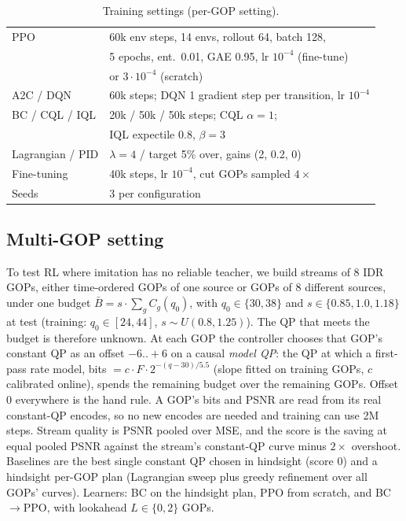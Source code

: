 \documentclass[conference]{IEEEtran}
\newcommand{\bcppo}{BC$\to$PPO}
\begin{document}
\begin{table}[t]
\centering\footnotesize
\caption{Training settings (per-GOP setting).}
\label{tab:hparams}
\setlength{\tabcolsep}{3pt}
\begin{tabular}{@{}ll@{}}
\toprule
PPO & 60k env steps, 14 envs, rollout 64, batch 128,\\
 & 5 epochs, ent.\ 0.01, GAE 0.95, lr $10^{-4}$ (fine-tune)\\
 & or $3{\cdot}10^{-4}$ (scratch)\\
A2C / DQN & 60k steps; DQN 1 gradient step per transition, lr $10^{-4}$\\
BC / CQL / IQL & 20k / 50k / 50k steps; CQL $\alpha{=}1$;\\
 & IQL expectile 0.8, $\beta{=}3$\\
Lagrangian / PID & $\lambda{=}4$ / target 5\% over, gains (2, 0.2, 0)\\
Fine-tuning & 40k steps, lr $10^{-4}$, cut GOPs sampled $4\times$\\
Seeds & 3 per configuration\\
\bottomrule
\end{tabular}
\end{table}

\subsection{Multi-GOP setting}\label{sec:mgdef}
To test RL where imitation has no reliable teacher, we build streams of 8 IDR GOPs, either time-ordered GOPs of one source or GOPs of 8 different sources, under one budget $\bar B = s\cdot\sum_g C_g(q_0)$, with $q_0 \in \{30,38\}$ and $s \in \{0.85, 1.0, 1.18\}$ at test (training: $q_0 \in [24,44]$, $s \sim U(0.8,1.25)$). The QP that meets the budget is therefore unknown. At each GOP the controller chooses that GOP's constant QP as an offset $-6..+6$ on a causal \emph{model QP}: the QP at which a first-pass rate model, bits $= c\cdot F\cdot 2^{-(q-30)/5.5}$ (slope fitted on training GOPs, $c$ calibrated online), spends the remaining budget over the remaining GOPs. Offset 0 everywhere is the hand rule. A GOP's bits and PSNR are read from its real constant-QP encodes, so no new encodes are needed and training can use 2M steps. Stream quality is PSNR pooled over MSE, and the score is the saving at equal pooled PSNR against the stream's constant-QP curve minus $2\times$ overshoot. Baselines are the best single constant QP chosen in hindsight (score 0) and a hindsight per-GOP plan (Lagrangian sweep plus greedy refinement over all GOPs' curves). Learners: BC on the hindsight plan, PPO from scratch, and \bcppo, with lookahead $L \in \{0, 2\}$ GOPs.
\end{document}
